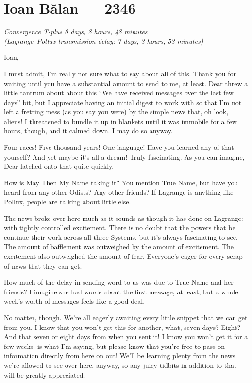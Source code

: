 \hypertarget{ioan-bux103lan-2346}{%
\chapter{Ioan Bălan — 2346}\label{ioan-bux103lan-2346}}

\begin{center}
\emph{Convergence T-plus 0 days, 8 hours, 48 minutes}\\
\emph{(Lagrange--Pollux transmission delay: 7 days, 3 hours, 53 minutes)}
\end{center}

\noindent Ioan,

I must admit, I'm really not sure what to say about all of this. Thank you for waiting until you have a substantial amount to send to me, at least. Dear threw a little tantrum about about this ``We have received messages over the last few days'' bit, but I appreciate having an initial digest to work with so that I'm not left a fretting mess (as you say you were) by the simple news that, oh look, aliens! I threatened to bundle it up in blankets until it was immobile for a few hours, though, and it calmed down. I may do so anyway.

Four races! Five thousand years! One language! Have you learned any of that, yourself? And yet maybe it's all a dream! Truly fascinating. As you can imagine, Dear latched onto that quite quickly.
 
How is May Then My Name taking it? You mention True Name, but have you heard from any other Odists? Any other friends? If Lagrange is anything like Pollux, people are talking about little else.

The news broke over here much as it sounds as though it has done on Lagrange: with tightly controlled excitement. There is no doubt that the powers that be continue their work across all three Systems, but it's always fascinating to see. The amount of bafflement was outweighed by the amount of excitement. The excitement also outweighed the amount of fear. Everyone's eager for every scrap of news that they can get.

How much of the delay in sending word to us was due to True Name and her friends? I imagine she had words about the first message, at least, but a whole week's worth of messages feels like a good deal.

No matter, though. We're all eagerly awaiting every little snippet that we can get from you. I know that you won't get this for another, what, seven days? Eight? And that seven or eight days from when you sent it! I know you won't get it for a few weeks, is what I'm saying, but please know that you're free to pass on information directly from here on out! We'll be learning plenty from the news we're allowed to see over here, anyway, so any juicy tidbits in addition to that will be greatly appreciated.

